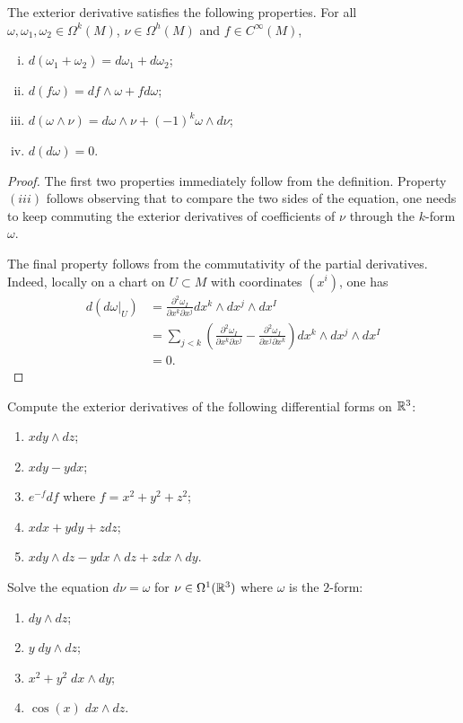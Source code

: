 \begin{lemma}
  The exterior derivative satisfies the following properties.
  For all $\omega,\omega_1,\omega_2\in\Omega^k(M)$, $\nu\in\Omega^h(M)$ and $f\in C^\infty(M)$,
  \begin{enumerate}[(i)]
    \item $d(\omega_1 + \omega_2) = d\omega_1 + d\omega_2$;
    \item $d(f\omega) = df\wedge \omega + f d\omega$;
    \item $d(\omega\wedge\nu) = d\omega\wedge \nu + (-1)^k \omega\wedge d\nu$;
    \item $d(d\omega) = 0$.
  \end{enumerate}
\end{lemma}
\begin{proof}
  The first two properties immediately follow from the definition.
  Property $(iii)$ follows observing that to compare the two sides of the equation, one needs to keep commuting the exterior derivatives of coefficients of $\nu$ through the $k$-form $\omega$.

  The final property follows from the commutativity of the partial derivatives. Indeed, locally on a chart on $U\subset M$ with coordinates $(x^i)$, one has
  \begin{align}
    d(d\omega|_U) &= \frac{\partial^2 \omega_I}{\partial x^k\partial x^j} dx^k\wedge dx^j \wedge dx^I \\
    &= \sum_{j<k} \left(\frac{\partial^2 \omega_I}{\partial x^k\partial x^j}  - \frac{\partial^2 \omega_I}{\partial x^j\partial x^k}\right)dx^k\wedge dx^j \wedge dx^I \\
    &= 0.
  \end{align}
\end{proof}

\begin{exercise}
  Compute the exterior derivatives of the following differential forms on $\mathbb{R}^3$:
  \begin{enumerate}
    \item $x dy \wedge dz$;
    \item $x dy - y dx$;
    \item $e^{-f}df$ where $f = x^2 + y^2 + z^2$;
    \item $x dx + y dy + z dz$;
    \item $x dy\wedge dz - y dx\wedge dz + z dx\wedge dy$.
  \end{enumerate}
\end{exercise}

\begin{exercise}
  Solve the equation $d \nu = \omega$ for $\nu \in \Omega^1(\mathbb{R}^3)$ where $\omega$ is the $2$-form:
  \begin{enumerate}
    \item $d y \wedge d z$;
    \item $y\; d y \wedge d z$;
    \item $x^2 + y^2 \; d x \wedge d y$;
    \item $\cos(x)\; d x \wedge d z$.
  \end{enumerate}
\end{exercise}

